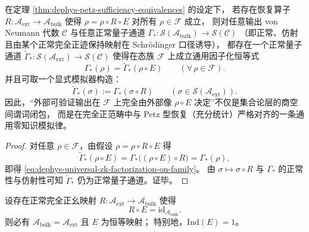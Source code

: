 \begin{corollary}\label{cor:dephys-universal-zk-simulation-factorization}
在定理 \ref{thm:dephys-petz-sufficiency-equivalences} 的设定下，
若存在恢复算子 \(R:\mathcal{A}_{\mathrm{ext}}\to\mathcal{A}_{\mathrm{bulk}}\) 使得
\(\rho=\rho\circ R\circ E\) 对所有 \(\rho\in\mathcal{F}\) 成立，
则对任意输出 von Neumann 代数 \(\mathcal{C}\) 与任意正常量子通道
\(\Gamma_*:\mathcal{S}(\mathcal{A}_{\mathrm{bulk}})\to\mathcal{S}(\mathcal{C})\)
（即正常、仿射且由某个正常完全正迹保持映射在 Schr\"odinger 口径诱导），
都存在一个正常量子通道
\(\widetilde\Gamma_*:\mathcal{S}(\mathcal{A}_{\mathrm{ext}})\to\mathcal{S}(\mathcal{C})\)
使得在态族 \(\mathcal{F}\) 上成立通用因子化恒等式
\begin{equation}\label{eq:dephys-universal-zk-factorization-on-family}
\boxed{\;
\Gamma_*(\rho)=\widetilde\Gamma_*(\rho\circ E)\qquad(\forall\,\rho\in\mathcal{F}).\;}
\end{equation}
并且可取一个显式模拟器构造：
\[
\boxed{\;
\widetilde\Gamma_*(\sigma):=\Gamma_*(\sigma\circ R)\qquad(\sigma\in\mathcal{S}(\mathcal{A}_{\mathrm{ext}})).\;}
\]
因此，“外部可验证输出在 \(\mathcal{F}\) 上完全由外部像 \(\rho\circ E\) 决定”不仅是集合论层的商空间谓词闭包，
而是在完全正范畴中与 Petz 型恢复（充分统计）严格对齐的一条通用零知识模拟律。
\end{corollary}

\begin{proof}
对任意 \(\rho\in\mathcal{F}\)，由假设 \(\rho=\rho\circ R\circ E\) 得
\[
\widetilde\Gamma_*(\rho\circ E)
=\Gamma_*\bigl((\rho\circ E)\circ R\bigr)
=\Gamma_*(\rho),
\]
即得 \eqref{eq:dephys-universal-zk-factorization-on-family}。
由 \(\sigma\mapsto \sigma\circ R\) 与 \(\Gamma_*\) 的正常性与仿射性可知 \(\widetilde\Gamma_*\) 仍为正常量子通道。证毕。
\end{proof}

\begin{corollary}[全态族可恢复 \(\Rightarrow\) 视界平凡：\(\mathrm{Ind}(E)=1\)]\label{cor:dephys-full-state-recovery-forces-trivial-index1}
设存在正常完全正幺映射 \(R:\mathcal{A}_{\mathrm{ext}}\to\mathcal{A}_{\mathrm{bulk}}\) 使得
\begin{equation}\label{eq:dephys-left-inverse-recovery-map}
\boxed{\;R\circ E=\mathrm{id}_{\mathcal{A}_{\mathrm{bulk}}}.\;}
\end{equation}
则必有 \(\mathcal{A}_{\mathrm{bulk}}=\mathcal{A}_{\mathrm{ext}}\) 且 \(E\) 为恒等映射；
特别地，\(\mathrm{Ind}(E)=1\)。
\end{corollary}

